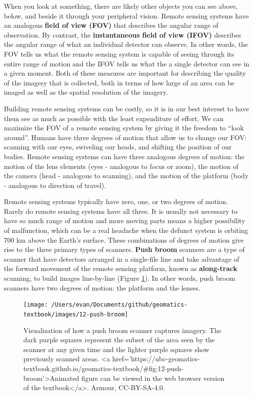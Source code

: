 \documentclass[
]{book}
\begin{document}
When you look at something, there are likely other objects you can see above, below, and beside it through your peripheral vision. Remote sensing systems have an analogous \textbf{field of view (FOV)} that describes the angular range of observation. By contrast, the \textbf{instantaneous field of view (IFOV)} describes the angular range of what an individual detector can observe. In other words, the FOV tells us what the remote sensing system is capable of seeing through its entire range of motion and the IFOV tells us what the a single detector can see in a given moment. Both of these measures are important for describing the quality of the imagery that is collected, both in terms of how large of an area can be imaged as well as the spatial resolution of the imagery.

Building remote sensing systems can be costly, so it is in our best interest to have them see as much as possible with the least expenditure of effort. We can maximize the FOV of a remote sensing system by giving it the freedom to ``look around''. Humans have three degrees of motion that allow us to change our FOV: scanning with our eyes, swiveling our heads, and shifting the position of our bodies. Remote sensing systems can have three analogous degrees of motion: the motion of the lens elements (eyes - analogous to focus or zoom), the motion of the camera (head - analogous to scanning), and the motion of the platform (body - analogous to direction of travel).

Remote sensing systems typically have zero, one, or two degrees of motion. Rarely do remote sensing systems have all three. It is usually not necessary to have so much range of motion and more moving parts means a higher possibility of malfunction, which can be a real headache when the defunct system is orbiting 700 km above the Earth's surface. These combinations of degrees of motion give rise to the three primary types of scanners. \textbf{Push broom} scanners are a type of scanner that have detectors arranged in a single-file line and take advantage of the forward movement of the remote sensing platform, known as \textbf{along-track} scanning, to build images line-by-line (Figure \ref{fig:12-push-broom}). In other words, push broom scanners have two degrees of motion: the platform and the lenses.

\begin{figure}
\texttt{[image: /Users/evan/Documents/github/geomatics-textbook/images/12-push-broom]} \caption{Visualization of how a push broom scanner captures imagery. The dark purple squares represent the subset of the area seen by the scanner at any given time and the lighter purple squares show previously scanned areas. <a href='https://ubc-geomatics-textbook.github.io/geomatics-textbook/#fig:12-push-broom'>Animated figure can be viewed in the web browser version of the textbook</a>. Armour, CC-BY-SA-4.0.}\label{fig:12-push-broom}
\end{figure}
\end{document}
